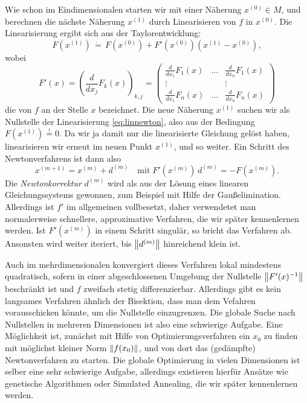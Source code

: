 Wie schon im Eindimensionalen starten wir mit einer Näherung
$x^{(0)}\in M$, und berechnen die nächste Näherung $x^{(1)}$ durch
Linearisieren von $f$ in $x^{(0)}$. Die Linearisierung ergibt sich aus
der Taylorentwicklung:
\begin{equation}
  \label{eq:linnewton}
  F(x^{(1)}) \,\dot{=}\, F(x^{(0)}) +
  F'(x^{(0)})\left(x^{(1)}-x^{(0)}\right),
\end{equation}
wobei
\begin{equation}
  F'(x) = \left(\frac{d}{dx_j}F_k(x)\right)_{k,j} = 
  \begin{pmatrix}
    \frac{d}{dx_1}F_1(x) & \ldots & \frac{d}{dx_n}F_1(x)\\
    \vdots               &        & \vdots \\
    \frac{d}{dx_1}F_n(x) & \ldots & \frac{d}{dx_n}F_n(x)
  \end{pmatrix}
\end{equation}
die \emph{} von $f$ an der Stelle $x$ bezeichnet.
Die neue Näherung $x^{(1)}$ suchen wir als Nullstelle der
Linearisierung \eqref{eq:linnewton}, also aus der Bedingung
$F(x^{(1)})\stackrel{!}{=} 0$. Da wir ja damit nur die
linearisierte Gleichung gelöst haben, linearisieren wir erneut im
neuen Punkt $x^{(1)}$, und so weiter. Ein Schritt des Newtonverfahrens
ist dann also
\begin{equation}
  x^{(m+1)} = x^{(m)} + d^{(m)}\quad\text{mit}\;
  F'(x^{(m)})\,d^{(m)} = -F(x^{(m)}).
\end{equation}
Die \emph{Newtonkorrektur} $d^{(m)}$ wird als aus der Lösung eines
linearen Gleichungssystems gewonnen, zum Beispiel mit Hilfe der
Gaußelimination. Allerdings ist $f'$ im allgemeinen vollbesetzt, daher
verwendetet man normalerweise schnellere, approximative Verfahren, die
wir später kennenlernen werden. Ist $F'(x^{(m)})$ in einem Schritt
singulär, so bricht das Verfahren ab. Ansonsten wird weiter iteriert,
bis $\left\lVert{d^{(m)}}\right\rVert$ hinreichend klein ist.

Auch im mehrdimensionalen konvergiert dieses Verfahren lokal
mindestens quadratisch, sofern in einer abgeschlossenen Umgebung der
Nullstelle $\left\lVert{F'(x)^{-1}}\right\rVert$ beschränkt ist und $f$ zweifach stetig
differenzierbar. Allerdings gibt es kein langsames Verfahren ähnlich
der Bisektion, dass man dem Vefahren vorausschicken könnte, um die
Nullstelle einzugrenzen. Die globale Suche nach Nullstellen in
mehreren Dimensionen ist also eine schwierige Aufgabe. Eine
Möglichkeit ist, zunächst mit Hilfe von Optimierungsverfahren ein
$x_0$ zu finden mit möglichst kleiner Norm $\left\lVert{f(x_0)}\right\rVert$, und von
dort das (gedämpfte) Newtonverfahren zu starten. Die globale
Optimierung in vielen Dimensionen ist selber eine sehr schwierige
Aufgabe, allerdings existieren hierfür Ansätze wie genetische
Algorithmen oder Simulated Annealing, die wir später kennenlernen
werden.


